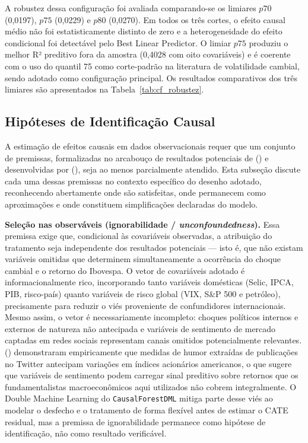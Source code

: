 \documentclass[	12pt, Times, openright, oneside, a4paper, english, brazil]{abntex2}
\begin{document}
A robustez dessa configuração foi avaliada comparando-se os limiares $p70$ (0,0197), $p75$ (0,0229) e $p80$ (0,0270). Em todos os três cortes, o efeito causal médio não foi estatisticamente distinto de zero e a heterogeneidade do efeito condicional foi detectável pelo Best Linear Predictor. O limiar $p75$ produziu o melhor R² preditivo fora da amostra (0,4028 com oito covariáveis) e é coerente com o uso do quantil 75 como corte-padrão na literatura de volatilidade cambial, sendo adotado como configuração principal. Os resultados comparativos dos três limiares são apresentados na Tabela~\ref{tab:cf_robustez}.

\subsection{Hipóteses de Identificação Causal}\label{sec:cf_hipoteses}

A estimação de efeitos causais em dados observacionais requer que um conjunto de premissas, formalizadas no arcabouço de resultados potenciais de \citeauthor{Rubin1974} (\citeyear{Rubin1974}) e desenvolvidas por \citeauthor{RosenbaumRubin1983} (\citeyear{RosenbaumRubin1983}), seja ao menos parcialmente atendido. Esta subseção discute cada uma dessas premissas no contexto específico do desenho adotado, reconhecendo abertamente onde são satisfeitas, onde permanecem como aproximações e onde constituem simplificações declaradas do modelo.

\textbf{Seleção nas observáveis (ignorabilidade / \textit{unconfoundedness}).} Essa premissa exige que, condicional às covariáveis observadas, a atribuição do tratamento seja independente dos resultados potenciais — isto é, que não existam variáveis omitidas que determinem simultaneamente a ocorrência do choque cambial e o retorno do Ibovespa. O vetor de covariáveis adotado é informacionalmente rico, incorporando tanto variáveis domésticas (Selic, IPCA, PIB, risco-país) quanto variáveis de risco global (VIX, S\&P 500 e petróleo), precisamente para reduzir o viés proveniente de confundidores internacionais. Mesmo assim, o vetor é necessariamente incompleto: choques políticos internos e externos de natureza não antecipada e variáveis de sentimento de mercado captadas em redes sociais representam canais omitidos potencialmente relevantes. \citeauthor{Bollen2011TwitterMood} (\citeyear{Bollen2011TwitterMood}) demonstraram empiricamente que medidas de humor extraídas de publicações no Twitter antecipam variações em índices acionários americanos, o que sugere que variáveis de sentimento podem carregar sinal preditivo sobre retornos que os fundamentalistas macroeconômicos aqui utilizados não cobrem integralmente. O Double Machine Learning do \texttt{CausalForestDML} mitiga parte desse viés ao modelar o desfecho e o tratamento de forma flexível antes de estimar o CATE residual, mas a premissa de ignorabilidade permanece como hipótese de identificação, não como resultado verificável.
\end{document}
